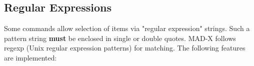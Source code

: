 




\subsection{Regular Expressions}
 Some commands allow selection of items via "regular expression" strings. Such a pattern string \textbf{must} be enclosed in single or double quotes. MAD-X follows regexp (Unix regular expression patterns) for matching. The following features are implemented: 

